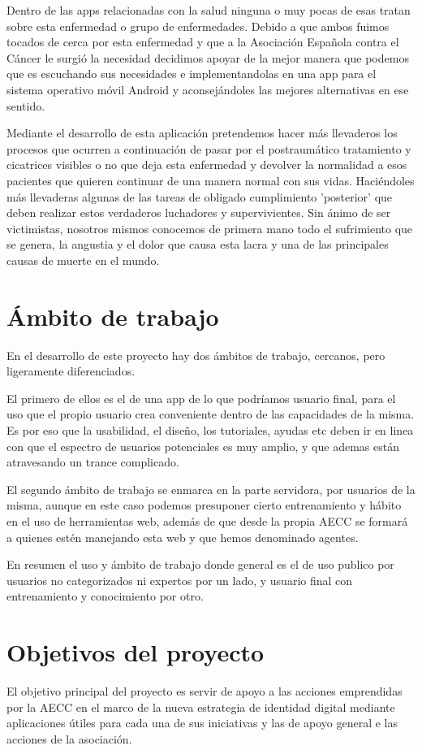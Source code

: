 \documentclass[b5paper,10pt,twoside]{book}
\begin{document}
	Dentro de las apps relacionadas con la salud ninguna o muy pocas de esas tratan sobre esta enfermedad o grupo de enfermedades. Debido a que ambos fuimos tocados de cerca por esta enfermedad y que a la Asociación Española contra el Cáncer le surgió la necesidad decidimos apoyar de la mejor manera que podemos que es escuchando sus necesidades e implementandolas en una app para el sistema operativo móvil Android y aconsejándoles las mejores alternativas en ese sentido. 
	
	Mediante el desarrollo de esta aplicación pretendemos hacer más llevaderos los procesos que ocurren a continuación de pasar por el postraumático tratamiento y cicatrices visibles o no que deja esta enfermedad y devolver la normalidad a esos pacientes que quieren continuar de una manera normal con sus vidas. Haciéndoles más llevaderas algunas de las tareas de obligado cumplimiento 'posterior' que deben realizar estos verdaderos luchadores y supervivientes.
	Sin ánimo de ser victimistas, nosotros mismos conocemos de primera mano todo el sufrimiento que se genera, la angustia y el dolor que causa esta lacra y una de las principales causas de muerte en el mundo.
	
	\section{Ámbito de trabajo}
	
	En el desarrollo de este proyecto hay dos ámbitos de trabajo, cercanos, pero ligeramente diferenciados.
	
	El primero de ellos es el de una app de lo que podríamos usuario final, para el uso que el propio usuario crea conveniente dentro de las capacidades de la misma. Es por eso que la usabilidad, el diseño, los tutoriales, ayudas etc deben ir en linea con que el espectro de usuarios potenciales es muy amplio, y que ademas están atravesando un trance complicado.
	
	El segundo ámbito de trabajo se enmarca en la parte servidora, por usuarios de la misma, aunque en este caso podemos presuponer cierto entrenamiento y hábito en el uso de herramientas web, además de que desde la propia AECC se formará a quienes estén manejando esta web y que hemos denominado agentes.
	
	En resumen el uso y ámbito de trabajo donde general es el de uso publico por usuarios no categorizados ni expertos por un lado, y usuario final con entrenamiento y conocimiento por otro.
	
	\section{Objetivos del proyecto}
	El objetivo principal del proyecto es servir de apoyo a las acciones emprendidas por la AECC en el marco de la nueva estrategia de identidad digital mediante aplicaciones útiles para cada una de sus iniciativas y las de apoyo general e las acciones de la asociación.
	
\end{document}
